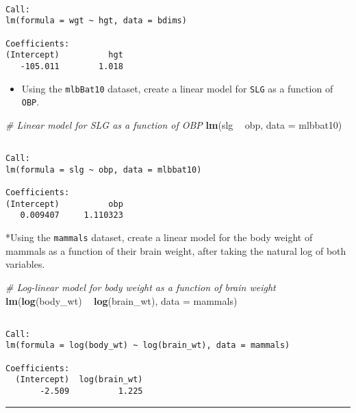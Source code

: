 \documentclass[
]{book}
\newenvironment{Shaded}{\begin{snugshade}}{\end{snugshade}}
\newcommand{\CommentTok}[1]{\textcolor[rgb]{0.56,0.35,0.01}{\textit{#1}}}
\newcommand{\DataTypeTok}[1]{\textcolor[rgb]{0.13,0.29,0.53}{#1}}
\newcommand{\KeywordTok}[1]{\textcolor[rgb]{0.13,0.29,0.53}{\textbf{#1}}}
\newcommand{\NormalTok}[1]{#1}
\newcommand{\OperatorTok}[1]{\textcolor[rgb]{0.81,0.36,0.00}{\textbf{#1}}}
\newcommand{\StringTok}[1]{\textcolor[rgb]{0.31,0.60,0.02}{#1}}
\providecommand{\tightlist}{%
  \setlength{\itemsep}{0pt}\setlength{\parskip}{0pt}}
\begin{document}
\begin{verbatim}

Call:
lm(formula = wgt ~ hgt, data = bdims)

Coefficients:
(Intercept)          hgt  
   -105.011        1.018  
\end{verbatim}

\begin{itemize}
\tightlist
\item
  Using the \texttt{mlbBat10} dataset, create a linear model for \texttt{SLG} as a function of \texttt{OBP}.
\end{itemize}

\begin{Shaded}
\begin{Highlighting}[]
\CommentTok{# Linear model for SLG as a function of OBP}
\KeywordTok{lm}\NormalTok{(slg }\OperatorTok{~}\StringTok{ }\NormalTok{obp, }\DataTypeTok{data =}\NormalTok{ mlbbat10)}
\end{Highlighting}
\end{Shaded}

\begin{verbatim}

Call:
lm(formula = slg ~ obp, data = mlbbat10)

Coefficients:
(Intercept)          obp  
   0.009407     1.110323  
\end{verbatim}

*Using the \texttt{mammals} dataset, create a linear model for the body weight of mammals as a function of their brain weight, after taking the natural log of both variables.

\begin{Shaded}
\begin{Highlighting}[]
\CommentTok{# Log-linear model for body weight as a function of brain weight}
\KeywordTok{lm}\NormalTok{(}\KeywordTok{log}\NormalTok{(body_wt) }\OperatorTok{~}\StringTok{ }\KeywordTok{log}\NormalTok{(brain_wt), }\DataTypeTok{data =}\NormalTok{ mammals)}
\end{Highlighting}
\end{Shaded}

\begin{verbatim}

Call:
lm(formula = log(body_wt) ~ log(brain_wt), data = mammals)

Coefficients:
  (Intercept)  log(brain_wt)  
       -2.509          1.225  
\end{verbatim}

\begin{center}\rule{0.5\linewidth}{0.5pt}\end{center}
\end{document}
